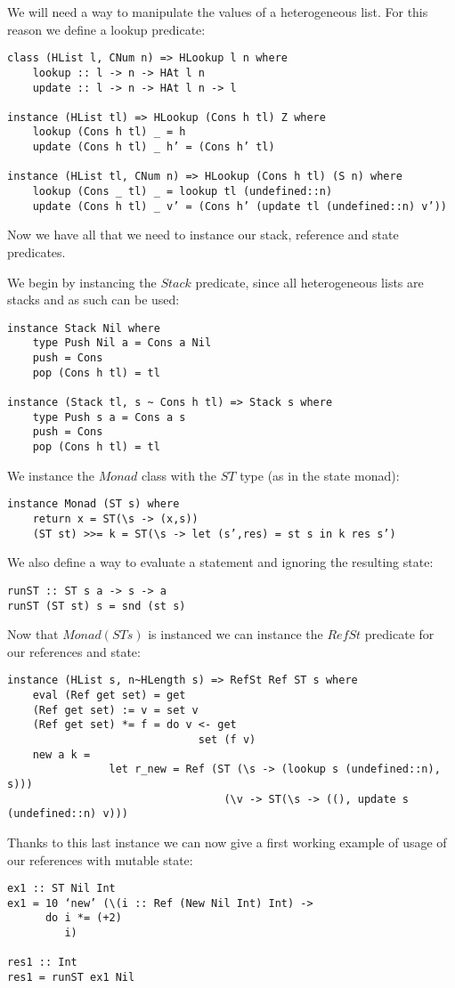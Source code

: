 We will need a way to manipulate the values of a heterogeneous list. For this reason we define a lookup predicate:
\begin{verbatim}
class (HList l, CNum n) => HLookup l n where
	lookup :: l -> n -> HAt l n
	update :: l -> n -> HAt l n -> l

instance (HList tl) => HLookup (Cons h tl) Z where
	lookup (Cons h tl) _ = h
	update (Cons h tl) _ h’ = (Cons h’ tl)

instance (HList tl, CNum n) => HLookup (Cons h tl) (S n) where
	lookup (Cons _ tl) _ = lookup tl (undefined::n)
	update (Cons h tl) _ v’ = (Cons h’ (update tl (undefined::n) v’))
\end{verbatim}

Now we have all that we need to instance our stack, reference and state predicates.

We begin by instancing the $Stack$ predicate, since all heterogeneous lists are stacks and as such can be used:
\begin{verbatim}
instance Stack Nil where
	type Push Nil a = Cons a Nil
	push = Cons
	pop (Cons h tl) = tl

instance (Stack tl, s ~ Cons h tl) => Stack s where
	type Push s a = Cons a s
	push = Cons
	pop (Cons h tl) = tl
\end{verbatim}

We instance the $Monad$ class with the $ST$ type (as in the state monad):
\begin{verbatim}
instance Monad (ST s) where
	return x = ST(\s -> (x,s))
	(ST st) >>= k = ST(\s -> let (s’,res) = st s in k res s’)
\end{verbatim}

We also define a way to evaluate a statement and ignoring the resulting state:
\begin{verbatim}
runST :: ST s a -> s -> a
runST (ST st) s = snd (st s)
\end{verbatim}

Now that $Monad (ST s)$ is instanced we can instance the $RefSt$ predicate for our references and state:
\begin{verbatim}
instance (HList s, n~HLength s) => RefSt Ref ST s where
	eval (Ref get set) = get
	(Ref get set) := v = set v
	(Ref get set) *= f = do v <- get
							  set (f v)
	new a k = 
				let r_new = Ref (ST (\s -> (lookup s (undefined::n), s)))
								  (\v -> ST(\s -> ((), update s (undefined::n) v)))
\end{verbatim}

Thanks to this last instance we can now give a first working example of usage of our references with mutable state:
\begin{verbatim}
ex1 :: ST Nil Int
ex1 = 10 ‘new’ (\(i :: Ref (New Nil Int) Int) -> 
	  do i *= (+2)
		 i)

res1 :: Int
res1 = runST ex1 Nil
\end{verbatim}

